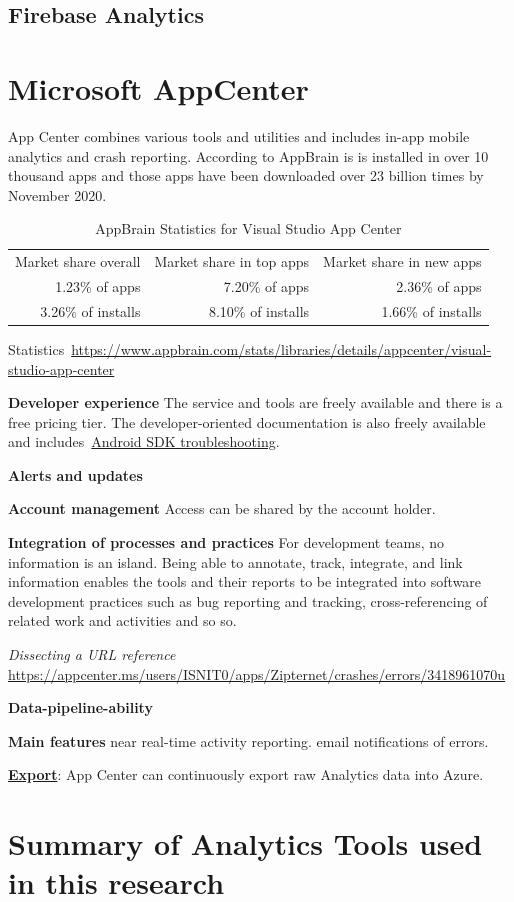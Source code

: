 \subsection{Firebase Analytics}

\section{Microsoft AppCenter}
App Center combines various tools and utilities and includes in-app mobile analytics and crash reporting. According to AppBrain is is installed in over 10 thousand apps and those apps have been downloaded over 23 billion times by  November 2020.

\begin{table}[htbp!]
    \centering
    \footnotesize
    \begin{tabular}{rrr}
      Market share overall  &Market share in top apps &Market share in new apps  \\
      1.23\% of apps	  &7.20\% of apps &2.36\% of apps\\
      3.26\% of installs &8.10\% of installs &1.66\% of installs \\
    \end{tabular}
    \caption{AppBrain Statistics for Visual Studio App Center}
    \label{tab:appbrain_statistics_appcenter}
\end{table}

	

Statistics~\url{https://www.appbrain.com/stats/libraries/details/appcenter/visual-studio-app-center}

\textbf{Developer experience} The service and tools are freely available and there is a free pricing tier. The developer-oriented documentation is also freely available and includes~\href{https://docs.microsoft.com/en-us/appcenter/sdk/troubleshooting/android}{Android SDK troubleshooting}.

\textbf{Alerts and updates} 

\textbf{Account management} Access can be shared by the account holder.

\textbf{Integration of processes and practices} For development teams, no information is an island. Being able to annotate, track, integrate, and link information enables the tools and their reports to be integrated into software development practices such as bug reporting and tracking, cross-referencing of related work and activities and so so.

\emph{Dissecting a URL reference}
\url{https://appcenter.ms/users/ISNIT0/apps/Zipternet/crashes/errors/3418961070u}


\textbf{Data-pipeline-ability}


\textbf{Main features}
near real-time activity reporting.
email notifications of errors.

\href{https://docs.microsoft.com/en-us/appcenter/analytics/export}{\textbf{Export}}: App Center can continuously export raw Analytics data into Azure.


\section{Summary of Analytics Tools used in this research}
